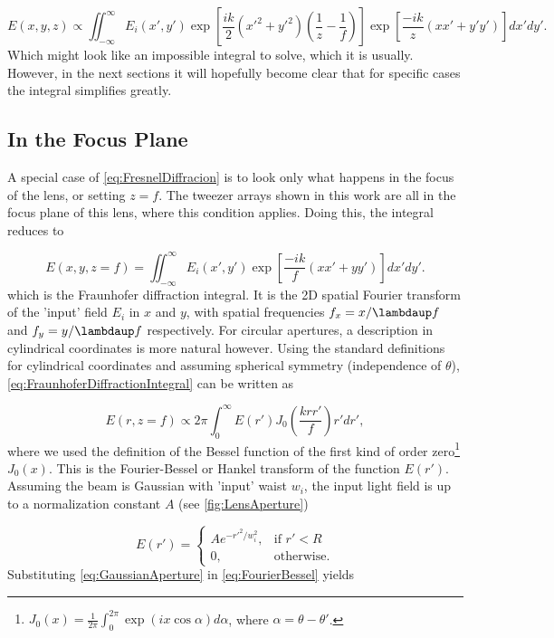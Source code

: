 \begin{equation}\label{eq:FresnelDiffracion}
	E(x,y,z) \propto 
	\iint_{-\infty}^{\infty} E_i(x',y')
	\exp{\left[
		\frac{ik}{2}(x'^2+y'^2)\left(\frac{1}{z}-\frac{1}{f}\right)
	\right]}
	\exp{\left[\frac{-ik}{z}\left(xx'+y'y'\right)\right]} dx'dy'.
\end{equation}
Which might look like an impossible integral to solve, which it is usually.
However, in the next sections it will hopefully become clear that for specific cases the integral simplifies greatly.  

\subsection{In the Focus Plane}

A special case of \cref{eq:FresnelDiffracion} is to look only what happens in the focus of the lens, or setting $z=f$.
The tweezer arrays shown in this work are all in the focus plane of this lens, where this condition applies.
Doing this, the integral reduces to 

\begin{equation}\label{eq:FraunhoferDiffractionIntegral}
    E(x, y, z=f)=\iint_{-\infty}^{\infty} E_i(x', y') \exp \left[\frac{-ik}{f}(x x'+y y')\right] dx' dy'.
\end{equation}
which is the Fraunhofer diffraction integral. 
It is the 2D spatial Fourier transform of the 'input' field $E_i$ in $x$ and $y$, with spatial frequencies $f_x = x/\lambdaup f$ and $f_y = y/\lambdaup f$ respectively.
For circular apertures, a description in cylindrical coordinates is more natural however. 
Using the standard definitions for cylindrical coordinates and assuming spherical symmetry (independence of $\theta$), \cref{eq:FraunhoferDiffractionIntegral} can be written as 

\begin{equation}\label{eq:FourierBessel}
	E(r,z=f) \propto 2\pi \int_0^{\infty} E(r') J_0\left( \frac{k r r'}{f}\right) r'dr',
\end{equation}
where we used the definition of the  Bessel function of the first kind of order zero\footnote{$J_0(x) = \frac{1}{2\pi} \int_0^{2\pi} \exp{(i x \cos{\alpha})} d\alpha$, where  $\alpha=\theta-\theta'$.} $J_0(x)$. 
This is the Fourier-Bessel or Hankel transform of the function $E(r')$.
Assuming the beam is Gaussian with 'input' waist $w_i$, the input light field is up to a normalization constant $A$ (see \cref{fig:LensAperture})

\begin{equation}\label{eq:GaussianAperture}
    E(r')=
    \begin{cases}
        A e^{- r'^2/w_i^2},& \text{if } r' < R\\
        0,               & \text{otherwise}.
    \end{cases}
\end{equation}
Substituting \cref{eq:GaussianAperture} in \cref{eq:FourierBessel} yields

